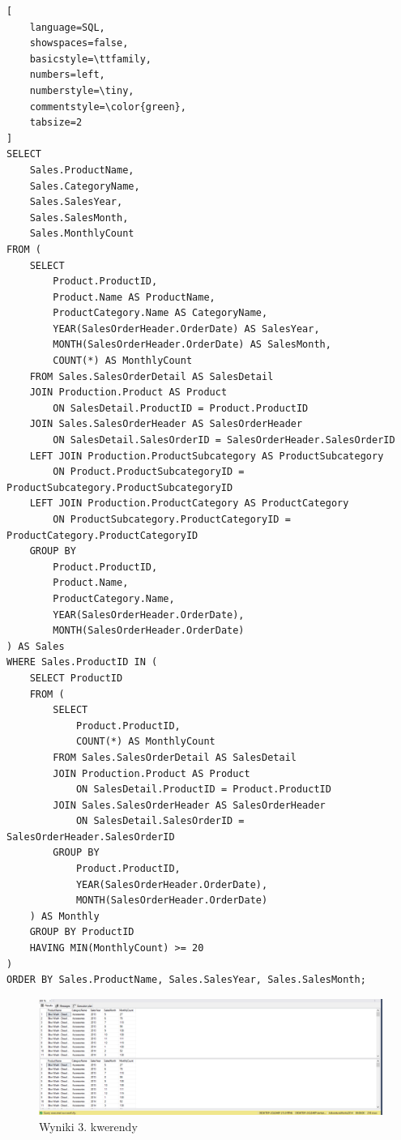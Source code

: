 \documentclass[a4paper,12pt]{article}
\begin{document}
{\small
\begin{lstlisting}[
	language=SQL,
	showspaces=false,
	basicstyle=\ttfamily,
	numbers=left,
	numberstyle=\tiny,
	commentstyle=\color{green},
	tabsize=2
]
SELECT 
    Sales.ProductName,
    Sales.CategoryName,
    Sales.SalesYear,
    Sales.SalesMonth,
    Sales.MonthlyCount
FROM (
    SELECT 
        Product.ProductID,
        Product.Name AS ProductName,
        ProductCategory.Name AS CategoryName,
        YEAR(SalesOrderHeader.OrderDate) AS SalesYear,
        MONTH(SalesOrderHeader.OrderDate) AS SalesMonth,
        COUNT(*) AS MonthlyCount
    FROM Sales.SalesOrderDetail AS SalesDetail
    JOIN Production.Product AS Product 
        ON SalesDetail.ProductID = Product.ProductID
    JOIN Sales.SalesOrderHeader AS SalesOrderHeader
        ON SalesDetail.SalesOrderID = SalesOrderHeader.SalesOrderID
    LEFT JOIN Production.ProductSubcategory AS ProductSubcategory
        ON Product.ProductSubcategoryID = ProductSubcategory.ProductSubcategoryID
    LEFT JOIN Production.ProductCategory AS ProductCategory
        ON ProductSubcategory.ProductCategoryID = ProductCategory.ProductCategoryID
    GROUP BY 
        Product.ProductID, 
        Product.Name,
        ProductCategory.Name,
        YEAR(SalesOrderHeader.OrderDate), 
        MONTH(SalesOrderHeader.OrderDate)
) AS Sales
WHERE Sales.ProductID IN (
    SELECT ProductID
    FROM (
        SELECT 
            Product.ProductID,
            COUNT(*) AS MonthlyCount
        FROM Sales.SalesOrderDetail AS SalesDetail
        JOIN Production.Product AS Product 
            ON SalesDetail.ProductID = Product.ProductID
        JOIN Sales.SalesOrderHeader AS SalesOrderHeader
            ON SalesDetail.SalesOrderID = SalesOrderHeader.SalesOrderID
        GROUP BY 
            Product.ProductID,
            YEAR(SalesOrderHeader.OrderDate), 
            MONTH(SalesOrderHeader.OrderDate)
    ) AS Monthly
    GROUP BY ProductID
    HAVING MIN(MonthlyCount) >= 20
)
ORDER BY Sales.ProductName, Sales.SalesYear, Sales.SalesMonth;
\end{lstlisting}}

\begin{figure}[H]
	\centering
	\includegraphics[width=1.0\textwidth]{images/3.png}
	\caption{Wyniki 3. kwerendy}
\end{figure}
\end{document}
